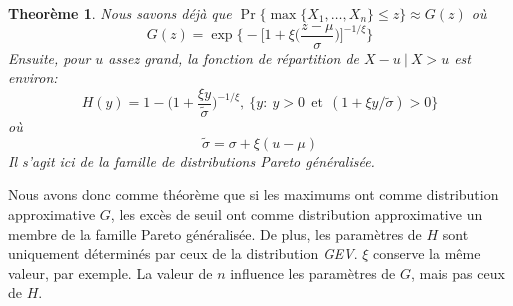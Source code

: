 \documentclass[11pt]{report}
\newtheorem{theorem}{Theorème}[chapter]
\numberwithin{equation}{section}
\begin{document}
\begin{theorem}\label{theor:1.2}
Nous savons déjà que $\Pr\{ \max\{X_1,\dots,X_n\} \le z \}\approx G(z)$
où
\begin{equation*}
{G(z) = \exp \Bigg\{ - \Big[ 1 +\xi\Big(\frac{z-\mu}{\sigma}\Big) \Big]^{-1/\xi}  \Bigg\}}
\end{equation*}
Ensuite, pour $u$ assez grand, la fonction de répartition de $X-u\ |\ X>u$ est environ:
\begin{equation*}
H(y) = 1 - \Big(1+\frac{\xi y}{\tilde\sigma}\Big)^{-1/\xi},\ \{y:\ y>0\ \ \text{et}\ \ (1+ \xi y/\tilde{\sigma})>0 \} 
\end{equation*}
où
\begin{equation*}
{\tilde{\sigma} = \sigma + \xi(u-\mu)}
\end{equation*}
Il s'agit ici de la famille de distributions Pareto généralisée.
\end{theorem}

Nous avons donc comme théorème que si les maximums ont comme distribution approximative $G$, les excès de seuil ont comme distribution approximative un membre de la famille Pareto généralisée. De plus, les paramètres de $H$ sont uniquement déterminés par ceux de la distribution \textit{GEV}. $\xi$ conserve la même valeur, par exemple. La valeur de $n$ influence les paramètres de $G$, mais pas ceux de $H$.
\end{document}

